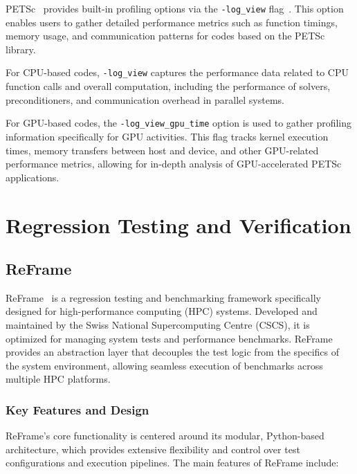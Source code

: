 PETSc~\cite{balay_petsc_2024} provides built-in profiling options via the \texttt{-log\_view} flag~\cite{balay_petsctao_2024}. 
This option enables users to gather detailed performance metrics such as function timings, memory usage, and communication patterns for codes based on the PETSc library. 

For CPU-based codes, \texttt{-log\_view} captures the performance data related to CPU function calls and overall computation, including the performance of solvers, preconditioners, and communication overhead in parallel systems.

For GPU-based codes, the \texttt{-log\_view\_gpu\_time} option is used to gather profiling information specifically for GPU activities. 
This flag tracks kernel execution times, memory transfers between host and device, and other GPU-related performance metrics, allowing for in-depth analysis of GPU-accelerated PETSc applications.




\section{Regression Testing and Verification}
\label{sec:methodology-regression}

\subsection{ReFrame}
\label{sec:methodology-regression-reframe}


ReFrame~\cite{karakasis_reframe-hpcreframe_2024} is a regression testing and benchmarking framework specifically designed for high-performance computing (HPC) systems. 
Developed and maintained by the Swiss National Supercomputing Centre (CSCS), it is optimized for managing system tests and performance benchmarks. 
ReFrame provides an abstraction layer that decouples the test logic from the specifics of the system environment, allowing seamless execution of benchmarks across multiple HPC platforms.

\subsubsection{Key Features and Design}

ReFrame's core functionality is centered around its modular, Python-based architecture, which provides extensive flexibility and control over test configurations and execution pipelines. The main features of ReFrame include:

